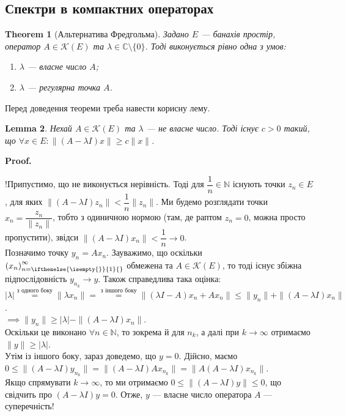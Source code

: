 \documentclass[a4paper, 10pt]{article}
\makeatletter
\theoremstyle{theoremdd}
\newtheorem{theorem}{Theorem}[subsection]
\theoremstyle{theoremdd}
\theoremstyle{theoremdd}
\theoremstyle{theoremdd}
\theoremstyle{theoremdd}
\theoremstyle{theoremdd}
\theoremstyle{theoremdd}
\newtheorem{lemma}[theorem]{Lemma}
\theoremstyle{theoremdd}
\newcommand{\sequence}[2][]{\left({#2}\right)_{n=\ifthenelse{\isempty{#1}}{1}{#1}}^{\infty}}
\renewenvironment{proof}[1][Proof.\\]{\par
\pushQED{\hfill \qed}%
\normalfont \topsep6\p@\@plus6\p@\relax
\trivlist
\item\relax
{\bfseries
#1\@addpunct{.}}\hspace\labelsep\ignorespaces
}{%
\popQED\endtrivlist\@endpefalse
}
\makeatother
\begin{document}
\subsection{Спектри в компактних операторах}
\begin{theorem}[Альтернатива Фредгольма]
Задано $E$ --- банахів простір, оператор $A \in \mathcal{K}(E)$ та $\lambda \in \mathbb{C} \setminus \{0\}$. Тоді виконується рівно одна з умов:
\begin{enumerate}[nosep,wide=0pt,label={\arabic*)}]
\item $\lambda$ --- власне число $A$;
\item $\lambda$ --- регулярна точка $A$.
\end{enumerate}
\end{theorem}

Перед доведення теореми треба навести корисну лему.
\begin{lemma}
Нехай $A \in \mathcal{K}(E)$ та $\lambda$ --- не власне число. Тоді існує $c > 0$ такий, що $\forall x \in E: \|(A-\lambda I)x\| \geq c\|x\|$.
\end{lemma}

\begin{proof}
!Припустимо, що не виконується нерівність. Тоді для $\dfrac{1}{n} \in \mathbb{N}$ існують точки $z_n \in E$, для яких $\| (A-\lambda I)z_n \| < \dfrac{1}{n}\|z_n\|$. Ми будемо розглядати точки $x_n = \dfrac{z_n}{\|z_n\|}$, тобто з одиничною нормою (там, де раптом $z_n = 0$, можна просто пропустити), звідси $\|(A-\lambda I)x_n\| < \dfrac{1}{n} \to 0$.\\
Позначимо точку $y_n = Ax_n$. Зауважимо, що оскільки $\sequence{x_n}$ обмежена та $A \in \mathcal{K}(E)$, то тоді існує збіжна підпослідовність $y_{n_k} \to y$. Також справедлива така оцінка:\\
$|\lambda| \overset{\text{з одного боку}}{=} \| \lambda x_n\| = \overset{\text{з іншого боку}}{=} \| (\lambda I-A)x_n + Ax_n \| \leq \|y_n\| + \|(A-\lambda I)x_n\|$.\\
$\implies \|y_n\| \geq |\lambda| - \|(A-\lambda I)x_n\|$.\\
Оскільки це виконано $\forall n \in \mathbb{N}$, то зокрема й для $n_k$, а далі при $k \to \infty$ отримаємо $\|y\| \geq |\lambda|$.\\
Утім із іншого боку, зараз доведемо, що $y = 0$. Дійсно, маємо\\
$0 \leq \|(A-\lambda I)y_{n_k} \| = \|(A-\lambda I) A x_{n_k}\| = \|A(A-\lambda I)x_{n_k}\|$.\\
Якщо спрямувати $k \to \infty$, то ми отримаємо $0 \leq \|(A-\lambda I)y\| \leq 0$, що свідчить про $(A-\lambda I)y = 0$. Отже, $y$ --- власне число оператора $A$ --- суперечність!
\end{proof}
\end{document}
